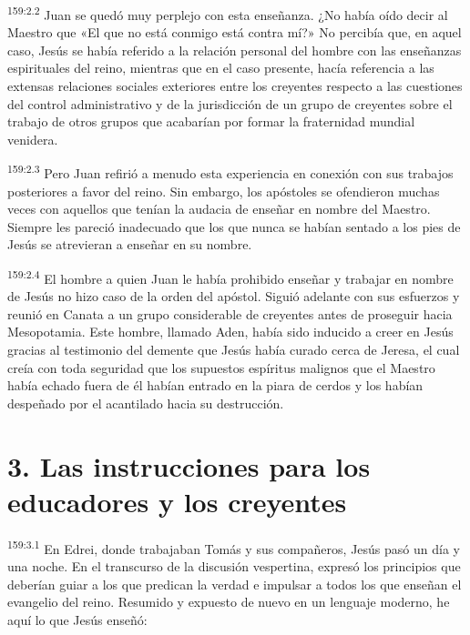 \par 
\textsuperscript{159:2.2} Juan se quedó muy perplejo con esta enseñanza. ¿No había oído decir al Maestro que «El que no está conmigo está contra mí?» No percibía que, en aquel caso, Jesús se había referido a la relación personal del hombre con las enseñanzas espirituales del reino, mientras que en el caso presente, hacía referencia a las extensas relaciones sociales exteriores entre los creyentes respecto a las cuestiones del control administrativo y de la jurisdicción de un grupo de creyentes sobre el trabajo de otros grupos que acabarían por formar la fraternidad mundial venidera.

\par 
\textsuperscript{159:2.3} Pero Juan refirió a menudo esta experiencia en conexión con sus trabajos posteriores a favor del reino. Sin embargo, los apóstoles se ofendieron muchas veces con aquellos que tenían la audacia de enseñar en nombre del Maestro. Siempre les pareció inadecuado que los que nunca se habían sentado a los pies de Jesús se atrevieran a enseñar en su nombre.

\par 
\textsuperscript{159:2.4} El hombre a quien Juan le había prohibido enseñar y trabajar en nombre de Jesús no hizo caso de la orden del apóstol. Siguió adelante con sus esfuerzos y reunió en Canata a un grupo considerable de creyentes antes de proseguir hacia Mesopotamia. Este hombre, llamado Aden, había sido inducido a creer en Jesús gracias al testimonio del demente que Jesús había curado cerca de Jeresa, el cual creía con toda seguridad que los supuestos espíritus malignos que el Maestro había echado fuera de él habían entrado en la piara de cerdos y los habían despeñado por el acantilado hacia su destrucción.

\section*{3. Las instrucciones para los educadores y los creyentes}
\par 
\textsuperscript{159:3.1} En Edrei, donde trabajaban Tomás y sus compañeros, Jesús pasó un día y una noche. En el transcurso de la discusión vespertina, expresó los principios que deberían guiar a los que predican la verdad e impulsar a todos los que enseñan el evangelio del reino. Resumido y expuesto de nuevo en un lenguaje moderno, he aquí lo que Jesús enseñó:

